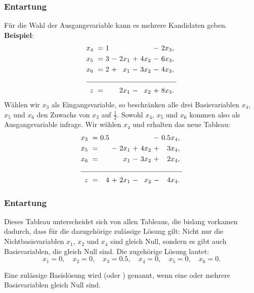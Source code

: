 \documentclass[smaller]{beamer}
\begin{document}
\begin{frame}
 \frametitle{Entartung}
 Für die Wahl der Ausgangsvariable kann es mehrere Kandidaten geben. \\
 \vspace*{0.2cm}
 \textbf{Beispiel}:
\begin{align*}
\begin{alignedat}{5}
x_4 &\ = &\ 1 &\   &       &\   &\      &\ - &\ 2x_3,\ \\
x_5 &\ = &\ 3 &\ - &\ 2x_1 &\ + &\ 4x_2 &\ - &\ 6x_3,\ \\ 
x_6 &\ = &\ 2 &\ + &\  x_1 &\ - &\ 3x_2 &\ - &\ 4x_3,\ \\ \cline{1-9}
z   &\ = &    &\   &\ 2x_1 &\ - &\  x_2 &\ + &\ 8x_3.\
\end{alignedat}
\end{align*}
Wählen wir $x_3$ als Eingangsvariable, so beschränken alle drei Basisvariablen $x_4$, $x_5$ und $x_6$ den Zuwachs von $x_3$ auf $\frac{1}{2}$. Sowohl $x_4$, $x_5$ und $x_6$ kommen also als Ausgangsvariable infrage. Wir wählen $x_4$ und erhalten das neue Tableau:
\begin{align*}
\begin{alignedat}{5}
x_3 &\ = &\ 0.5 &\   &       &\   &\      &\ - &\ 0.5x_4,\ \\
x_5 &\ = &\     &\ - &\ 2x_1 &\ + &\ 4x_2 &\ + &\   3x_4,\ \\ 
x_6 &\ = &\     &\   &\  x_1 &\ - &\ 3x_2 &\ + &\   2x_4,\ \\ \cline{1-9}
z   &\ = &\   4 &\ + &\ 2x_1 &\ - &\  x_2 &\ - &\   4x_4.\
\end{alignedat}
\end{align*}
\end{frame}

\begin{frame}
 \frametitle{Entartung}
 \alert{Dieses Tableau unterscheidet sich von allen Tableaus, die bislang vorkamen} dadurch, dass für die dazugehörige zulässige Lösung gilt: Nicht nur die Nichtbasisvariablen $x_1$, $x_2$ und $x_4$ sind gleich Null, sondern es gibt auch Basisvariablen, die gleich Null sind. Die zugehörige Lösung lautet:
\[
x_1=0,\quad x_2=0,\quad x_3=0.5,\quad x_4=0,\quad x_5=0,\quad x_6=0.
\]

Eine zulässige Basislösung wird  (oder ) genannt, wenn eine oder mehrere Basisvariablen gleich Null sind.
\end{frame}
\end{document}
